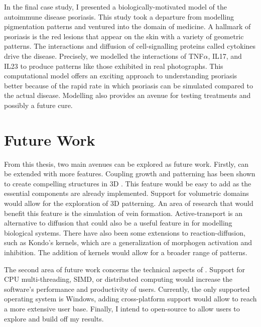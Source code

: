 In the final case study, I presented a biologically-motivated model of the autoimmune disease psoriasis. This study took a departure from modelling pigmentation patterns and ventured into the domain of medicine. A hallmark of psoriasis is the red lesions that appear on the skin with a variety of geometric patterns. The interactions and diffusion of cell-signalling proteins called cytokines drive the disease. Precisely, we modelled the interactions of TNF$\alpha$, IL17, and IL23 to produce patterns like those exhibited in real photographs. This computational model offers an exciting approach to understanding psoriasis better because of the rapid rate in which psoriasis can be simulated compared to the actual disease. Modelling also provides an avenue for testing treatments and possibly a future cure.

\section{Future Work}
From this thesis, two main avenues can be explored as future work. Firstly, \ProgramName{} can be extended with more features. Coupling growth and patterning has been shown to create compelling structures in 3D \cite{harrison2002, holloway2007}. This feature would be easy to add as the essential components are already implemented. Support for volumetric domains would allow for the exploration of 3D patterning. An area of research that would benefit this feature is the simulation of vein formation. Active-transport is an alternative to diffusion that could also be a useful feature in \ProgramName{} for modelling biological systems. There have also been some extensions to reaction-diffusion, such as Kondo's kernels, which are a generalization of morphogen activation and inhibition. The addition of kernels would allow for a broader range of patterns. 

The second area of future work concerns the technical aspects of \ProgramName{}. Support for CPU multi-threading, SIMD, or distributed computing would increase the software's performance and productivity of users. Currently, the only supported operating system is Windows, adding cross-platform support would allow \ProgramName{} to reach a more extensive user base. Finally, I intend to open-source \ProgramName{} to allow users to explore and build off my results.